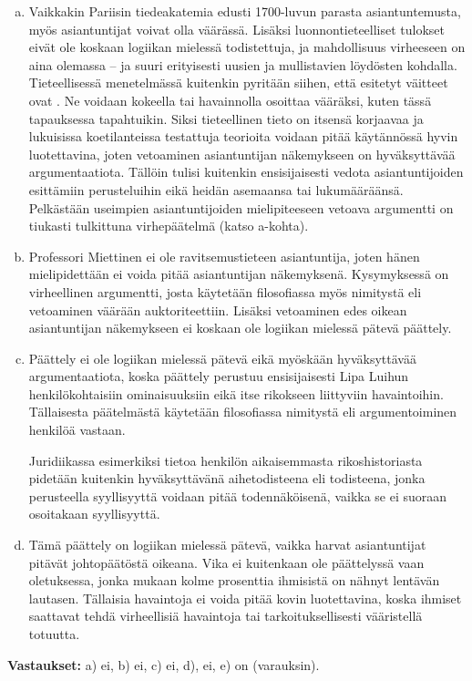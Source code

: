 \begin{esimerkki}
\begin{enumerate}[a)]
            \item Vaikkakin Pariisin tiedeakatemia edusti 1700-luvun parasta asiantuntemusta, myös asiantuntijat voivat olla väärässä. Lisäksi luonnontieteelliset tulokset eivät ole koskaan logiikan mielessä todistettuja, ja mahdollisuus virheeseen on aina olemassa -- ja suuri erityisesti uusien ja mullistavien löydösten kohdalla. Tieteellisessä menetelmässä kuitenkin pyritään siihen, että esitetyt väitteet ovat . Ne voidaan kokeella tai havainnolla osoittaa vääräksi, kuten tässä tapauksessa tapahtuikin. Siksi tieteellinen tieto on itsensä korjaavaa ja lukuisissa koetilanteissa testattuja teorioita voidaan pitää käytännössä hyvin luotettavina, joten vetoaminen asiantuntijan näkemykseen on hyväksyttävää argumentaatiota. Tällöin tulisi kuitenkin ensisijaisesti vedota asiantuntijoiden esittämiin perusteluihin eikä heidän asemaansa tai lukumääräänsä. Pelkästään useimpien asiantuntijoiden mielipiteeseen vetoava argumentti on tiukasti tulkittuna virhepäätelmä (katso a-kohta).
            \item Professori Miettinen ei ole ravitsemustieteen asiantuntija, joten hänen mielipidettään ei voida pitää 
                asiantuntijan näkemyksenä.
                Kysymyksessä on virheellinen argumentti, josta käytetään filosofiassa myös nimitystä
                 eli vetoaminen väärään auktoriteettiin.
                Lisäksi vetoaminen edes oikean asiantuntijan näkemykseen ei koskaan ole logiikan mielessä pätevä päättely.
            \item Päättely ei ole logiikan mielessä pätevä eikä myöskään hy\-väk\-syt\-tä\-vää argumentaatiota,
                koska  päättely perustuu ensisijaisesti Lipa Luihun henkilökohtaisiin ominaisuuksiin eikä itse
                rikokseen liittyviin havaintoihin. Tällaisesta päätelmästä käytetään filosofiassa nimitystä 
                 eli argumentoiminen henkilöä vastaan.
                
                Juridiikassa esimerkiksi tietoa henkilön aikaisemmasta rikoshistoriasta pidetään kuitenkin
                hyväksyttävänä aihetodisteena eli todisteena, jonka perusteella syyllisyyttä voidaan pitää
                todennäköisenä, vaikka se ei suoraan osoitakaan syyllisyyttä.
            \item Tämä päättely on logiikan mielessä pätevä, vaikka harvat asiantuntijat pitävät johtopäätöstä oikeana.
                Vika ei kuitenkaan ole päättelyssä vaan oletuksessa, jonka mukaan kolme prosenttia ihmisistä on nähnyt 
                lentävän lautasen.
                Tällaisia havaintoja ei voida pitää kovin luotettavina, koska ihmiset saattavat tehdä virheellisiä 
                havaintoja tai tarkoituksellisesti vääristellä totuutta.
        \end{enumerate}
    \textbf{Vastaukset:}
        a) ei, b) ei, c) ei, d), ei, e) on (varauksin).
\end{esimerkki}

